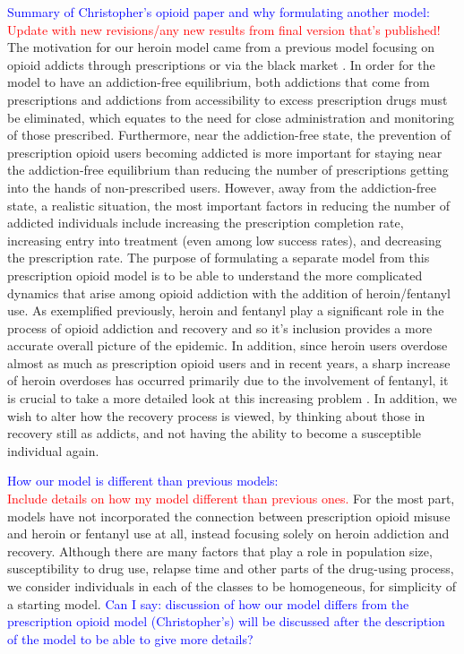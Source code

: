 \documentclass[12pt]{article}
\begin{document}
\textcolor{blue}{Summary of Christopher's opioid paper and why formulating another model:} \\
\textcolor{red}{Update with new revisions/any new results from final version that's published!} The motivation for our heroin model came from a previous model focusing on opioid addicts through prescriptions or via the black market \cite{Battista}. In order for the model to have an addiction-free equilibrium, both addictions that come from prescriptions and addictions from accessibility to excess prescription drugs must be eliminated, which equates to the need for close administration and monitoring of those prescribed. Furthermore, near the addiction-free state, the prevention of prescription opioid users becoming addicted is more important for staying near the addiction-free equilibrium than reducing the number of prescriptions getting into the hands of non-prescribed users. However, away from the addiction-free state, a realistic situation, the most important factors in reducing the number of addicted individuals include increasing the prescription completion rate, increasing entry into treatment (even among low success rates), and decreasing the prescription rate. The purpose of formulating a separate model from this prescription opioid model is to be able to understand the more complicated dynamics that arise among opioid addiction with the addition of heroin/fentanyl use. As exemplified previously, heroin and fentanyl play a significant role in the process of opioid addiction and recovery and so it's inclusion provides a more accurate overall picture of the epidemic. In addition, since heroin users overdose almost as much as prescription opioid users and in recent years, a sharp increase of heroin overdoses has occurred primarily due to the involvement of fentanyl, it is crucial to take a more detailed look at this increasing problem \cite{CDC4}. In addition, we wish to alter how the recovery process is viewed, by thinking about those in recovery still as addicts, and not having the ability to become a susceptible individual again. 




\textcolor{blue}{How our model is different than previous models:} \\
\textcolor{red}{Include details on how my model different than previous ones.} For the most part, models have not incorporated the connection between prescription opioid misuse and heroin or fentanyl use at all, instead focusing solely on heroin addiction and recovery. Although there are many factors that play a role in population size, susceptibility to drug use, relapse time and other parts of the drug-using process, we consider individuals in each of the classes to be homogeneous, for simplicity of a starting model. \textcolor{blue}{Can I say: discussion of how our model differs from the prescription opioid model (Christopher's) will be discussed after the description of the model to be able to give more details?}
\end{document}
